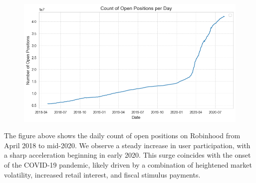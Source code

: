 \begin{figure}[h!]
    \centering
    \includegraphics[width=0.8\linewidth]{../images/no_positions_date.png}
\end{figure}

The figure above shows the daily count of open positions on Robinhood from April 2018 to mid-2020. 
We observe a steady increase in user participation, with a sharp acceleration beginning in early 2020. 
This surge coincides with the onset of the COVID-19 pandemic, likely driven by a combination of heightened market volatility, increased retail interest, and fiscal stimulus payments.
